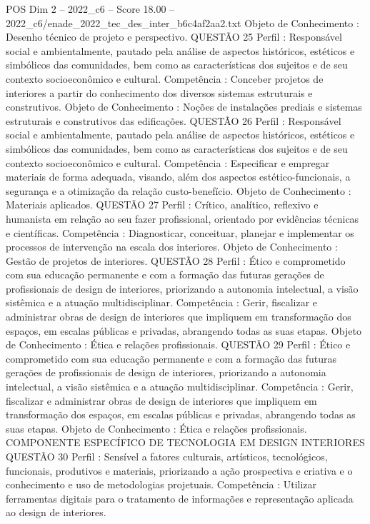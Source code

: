 \begin{textsample}{POS Dim 2 – 2022\_c6 – Score 18.00 – 2022\_c6/enade\_2022\_tec\_des\_inter\_b6c4af2aa2.txt}
Objeto de Conhecimento : Desenho técnico de projeto e perspectivo.
QUESTÃO 25 Perfil : Responsável social e ambientalmente, pautado pela análise de aspectos históricos, estéticos e simbólicos das comunidades, bem como as características dos sujeitos e de seu contexto socioeconômico e cultural.
Competência : Conceber projetos de interiores a partir do conhecimento dos diversos sistemas estruturais e construtivos.
Objeto de Conhecimento : Noções de instalações prediais e sistemas estruturais e construtivos das edificações.
QUESTÃO 26 Perfil : Responsável social e ambientalmente, pautado pela análise de aspectos históricos, estéticos e simbólicos das comunidades, bem como as características dos sujeitos e de seu contexto socioeconômico e cultural.
Competência : Especificar e empregar materiais de forma adequada, visando, além dos aspectos estético-funcionais, a segurança e a otimização da relação custo-benefício.
Objeto de Conhecimento : Materiais aplicados.
QUESTÃO 27 Perfil : Crítico, analítico, reflexivo e humanista em relação ao seu fazer profissional, orientado por evidências técnicas e científicas.
Competência : Diagnosticar, conceituar, planejar e implementar os processos de intervenção na escala dos interiores.
Objeto de Conhecimento : Gestão de projetos de interiores.
QUESTÃO 28 Perfil : Ético e comprometido com sua educação permanente e com a formação das futuras gerações de profissionais de design de interiores, priorizando a autonomia intelectual, a visão sistêmica e a atuação multidisciplinar.
Competência : Gerir, fiscalizar e administrar obras de design de interiores que impliquem em transformação dos espaços, em escalas públicas e privadas, abrangendo todas as suas etapas.
Objeto de Conhecimento : Ética e relações profissionais.
QUESTÃO 29 Perfil : Ético e comprometido com sua educação permanente e com a formação das futuras gerações de profissionais de design de interiores, priorizando a autonomia intelectual, a visão sistêmica e a atuação multidisciplinar.
Competência : Gerir, fiscalizar e administrar obras de design de interiores que impliquem em transformação dos espaços, em escalas públicas e privadas, abrangendo todas as suas etapas.
Objeto de Conhecimento : Ética e relações profissionais.
COMPONENTE ESPECÍFICO DE TECNOLOGIA EM DESIGN INTERIORES QUESTÃO 30 Perfil : Sensível a fatores culturais, artísticos, tecnológicos, funcionais, produtivos e materiais, priorizando a ação prospectiva e criativa e o conhecimento e uso de metodologias projetuais.
Competência : Utilizar ferramentas digitais para o tratamento de informações e representação aplicada ao design de interiores.

\end{textsample}
